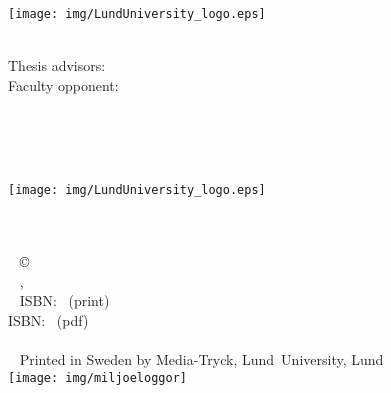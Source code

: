 \frontmatter %

\thispagestyle{empty} %
\begin{center}
\vspace*{5cm}
{\Huge \myMainTitle}
{\LARGE \mySubTitle}
\end{center}


\cleardoublepage
\thispagestyle{empty} %
~

\vfill
\begin{center}
{\Huge \myMainTitle}
\\[2mm]
{\huge \mySubTitle}
\vfill
{\Huge \myName}

\vfill
\texttt{[image: img/LundUniversity\_logo.eps]}

\vspace{10mm}
{\large \myDegree}\\
{\large Thesis advisors: \myAdvisors}\\
{\large Faculty opponent: \myOpponent}\\
\vspace{1cm}
{\footnotesize \myDefenceAnnouncement}
\\
\end{center}
\vfill

\newpage \thispagestyle{empty} %


\cleardoublepage
\thispagestyle{empty} %
~
\vfill
\begin{center}
{\Huge \myMainTitle}
\\[2mm]
{\huge \mySubTitle}
\vfill
{\Huge \myName}
\vfill
\texttt{[image: img/LundUniversity\_logo.eps]}
\end{center}
\vfill


\newpage 
\thispagestyle{empty} %
~
\vfill
\myBlurb
\vfill
{\small
\myCoverFront\\
~
\myCoverBack\\
~
\myFundingSource
\vspace{5mm}
\copyright\, \myName~\myCopyrightYear\\
~
\myFaculty, {\myDepartment} \\
~
ISBN: \myISBNprint~(print)\\ %
ISBN: \myISBNpdf~(pdf)\\ %
\mySeries\\
~
Printed in Sweden by Media-Tryck, Lund~University, Lund~\myCopyrightYear\\
\texttt{[image: img/miljoeloggor]}
}
